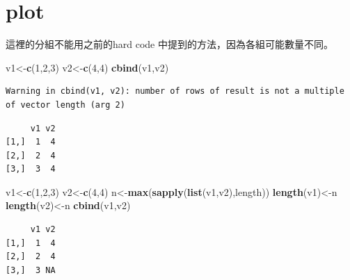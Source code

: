 \documentclass[]{book}
\newenvironment{Shaded}{\begin{snugshade}}{\end{snugshade}}
\newcommand{\DecValTok}[1]{\textcolor[rgb]{0.00,0.00,0.81}{#1}}
\newcommand{\KeywordTok}[1]{\textcolor[rgb]{0.13,0.29,0.53}{\textbf{#1}}}
\newcommand{\NormalTok}[1]{#1}
\theoremstyle{definition}
\theoremstyle{definition}
\theoremstyle{definition}
\theoremstyle{remark}
\begin{document}
\hypertarget{plot}{%
\section{plot}\label{plot}}

這裡的分組不能用之前的hard code 中提到的方法，因為各組可能數量不同。

\begin{Shaded}
\begin{Highlighting}[]
\NormalTok{v1<-}\KeywordTok{c}\NormalTok{(}\DecValTok{1}\NormalTok{,}\DecValTok{2}\NormalTok{,}\DecValTok{3}\NormalTok{)}
\NormalTok{v2<-}\KeywordTok{c}\NormalTok{(}\DecValTok{4}\NormalTok{,}\DecValTok{4}\NormalTok{)}
\KeywordTok{cbind}\NormalTok{(v1,v2)}
\end{Highlighting}
\end{Shaded}

\begin{verbatim}
Warning in cbind(v1, v2): number of rows of result is not a multiple
of vector length (arg 2)
\end{verbatim}

\begin{verbatim}
     v1 v2
[1,]  1  4
[2,]  2  4
[3,]  3  4
\end{verbatim}

\begin{Shaded}
\begin{Highlighting}[]
\NormalTok{v1<-}\KeywordTok{c}\NormalTok{(}\DecValTok{1}\NormalTok{,}\DecValTok{2}\NormalTok{,}\DecValTok{3}\NormalTok{)}
\NormalTok{v2<-}\KeywordTok{c}\NormalTok{(}\DecValTok{4}\NormalTok{,}\DecValTok{4}\NormalTok{)}
\NormalTok{n<-}\KeywordTok{max}\NormalTok{(}\KeywordTok{sapply}\NormalTok{(}\KeywordTok{list}\NormalTok{(v1,v2),length))}
\KeywordTok{length}\NormalTok{(v1)<-n}
\KeywordTok{length}\NormalTok{(v2)<-n}
\KeywordTok{cbind}\NormalTok{(v1,v2)}
\end{Highlighting}
\end{Shaded}

\begin{verbatim}
     v1 v2
[1,]  1  4
[2,]  2  4
[3,]  3 NA
\end{verbatim}
\end{document}
